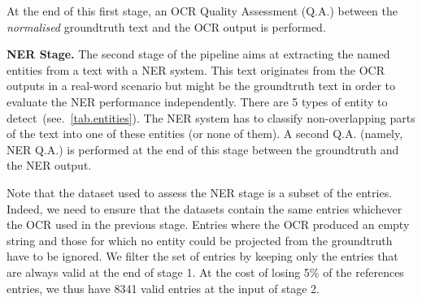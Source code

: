 At the end of this first stage, an OCR Quality Assessment (Q.A.) between the \emph{normalised} groundtruth text and the
OCR output is performed.





\textbf{NER Stage.} The second stage of the pipeline aims at extracting the named entities from a text with a NER
system. This text originates from the OCR outputs in a real-word scenario but might be the groundtruth text in order to
evaluate the NER performance independently. There are 5 types of entity to detect~(see.~\cref{tab.entities}).
The NER system has to classify non-overlapping parts of the text into one of these entities (or none of them). A second
Q.A. (namely, NER Q.A.) is performed at the end of this stage between the groundtruth and the NER output.

Note that the dataset used to assess the NER stage is a subset of the entries. Indeed, we need to ensure that the datasets
contain the same entries whichever the OCR used in the previous stage. Entries where the OCR produced an empty string
and those for which no entity could be projected from the groundtruth have to be ignored. We filter the set of entries by
keeping only the entries that are always valid at the end of stage 1. At the cost of losing 5\% of the references
entries, we thus have 8341 valid entries at the input of stage 2.


